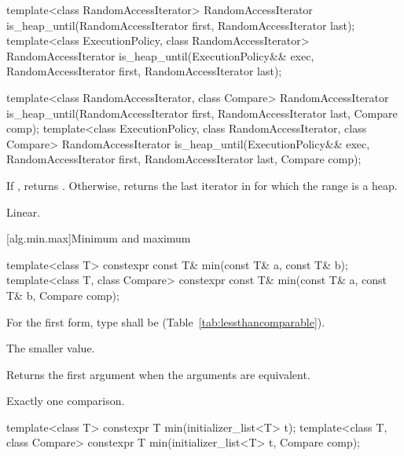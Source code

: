 %
\begin{itemdecl}
template<class RandomAccessIterator>
  RandomAccessIterator is_heap_until(RandomAccessIterator first, RandomAccessIterator last);
template<class ExecutionPolicy, class RandomAccessIterator>
  RandomAccessIterator is_heap_until(ExecutionPolicy&& exec,
                                     RandomAccessIterator first, RandomAccessIterator last);

template<class RandomAccessIterator, class Compare>
  RandomAccessIterator is_heap_until(RandomAccessIterator first, RandomAccessIterator last,
                                     Compare comp);
template<class ExecutionPolicy, class RandomAccessIterator, class Compare>
  RandomAccessIterator is_heap_until(ExecutionPolicy&& exec,
                                     RandomAccessIterator first, RandomAccessIterator last,
                                     Compare comp);
\end{itemdecl}


\begin{itemdescr}
\pnum
\returns If , returns
. Otherwise, returns
the last iterator  in  for which the
range  is a heap.

\pnum
\complexity Linear.
\end{itemdescr}


[alg.min.max]{Minimum and maximum}

%
\begin{itemdecl}
template<class T> constexpr const T& min(const T& a, const T& b);
template<class T, class Compare>
  constexpr const T& min(const T& a, const T& b, Compare comp);
\end{itemdecl}

\begin{itemdescr}
\pnum
\requires
For the first form, type  shall be
 (Table~\ref{tab:lessthancomparable}).

\pnum
\returns
The smaller value.

\pnum
\remarks
Returns the first argument when the arguments are equivalent.

\pnum
\complexity
Exactly one comparison.
\end{itemdescr}

%
\begin{itemdecl}
template<class T>
  constexpr T min(initializer_list<T> t);
template<class T, class Compare>
  constexpr T min(initializer_list<T> t, Compare comp);
\end{itemdecl}

